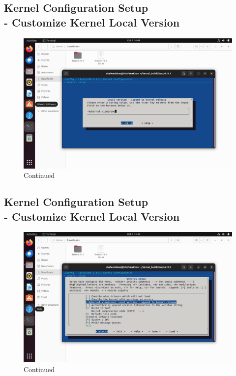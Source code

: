 \documentclass{article}
\begin{document}
\subsection{Kernel Configuration Setup\\ - Customize Kernel Local Version}
\begin{figure}[H]
    \centering
    \includegraphics[width=0.8\linewidth]{53.jpg}
    \caption{Continued}
\end{figure}

\subsection{Kernel Configuration Setup\\ - Customize Kernel Local Version}
\begin{figure}[H]
    \centering
    \includegraphics[width=0.8\linewidth]{52.jpg}
    \caption{Continued}
\end{figure}
\end{document}
